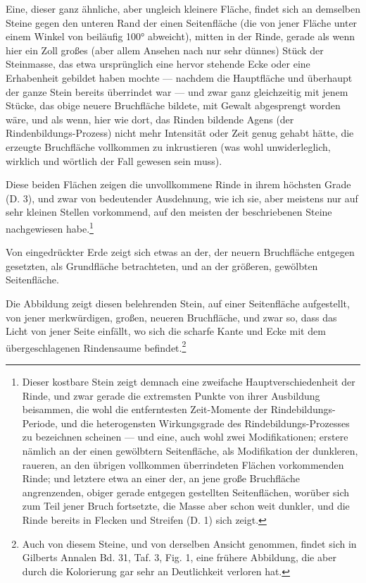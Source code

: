 \documentclass[a4paper, 11pt, oneside, german]{article}
\begin{document}
Eine, dieser ganz ähnliche, aber ungleich kleinere Fläche, findet sich an demselben Steine gegen den unteren Rand der einen Seitenfläche (die von jener Fläche unter einem Winkel von beiläufig 100° abweicht), mitten in der Rinde, gerade als wenn hier ein Zoll großes (aber allem Ansehen nach nur sehr dünnes) Stück der Steinmasse, das etwa ursprünglich eine hervor stehende Ecke oder eine Erhabenheit gebildet haben mochte --- nachdem die Hauptfläche und überhaupt der ganze Stein bereits überrindet war --- und zwar ganz gleichzeitig mit jenem Stücke, das obige neuere Bruchfläche bildete, mit Gewalt abgesprengt worden wäre, und als wenn, hier wie dort, das Rinden bildende Agens (der Rindenbildungs-Prozess) nicht mehr Intensität oder Zeit genug gehabt hätte, die erzeugte Bruchfläche vollkommen zu inkrustieren (was wohl unwiderleglich, wirklich und wörtlich der Fall gewesen sein muss).

Diese beiden Flächen zeigen die unvollkommene Rinde in ihrem höchsten Grade (D. 3), und zwar von bedeutender Ausdehnung, wie ich sie, aber meistens nur auf sehr kleinen Stellen vorkommend, auf den meisten der beschriebenen Steine nachgewiesen habe.\footnote{Dieser kostbare Stein zeigt demnach eine zweifache Hauptverschiedenheit der Rinde, und zwar gerade die extremsten Punkte von ihrer Ausbildung beisammen, die wohl die entferntesten Zeit-Momente der Rindebildungs-Periode, und die heterogensten Wirkungsgrade des Rindebildungs-Prozesses zu bezeichnen scheinen --- und eine, auch wohl zwei Modifikationen; erstere nämlich an der einen gewölbtern Seitenfläche, als Modifikation der dunkleren, raueren, an den übrigen vollkommen überrindeten Flächen vorkommenden Rinde; und letztere etwa an einer der, an jene große Bruchfläche angrenzenden, obiger gerade entgegen gestellten Seitenflächen, worüber sich zum Teil jener Bruch fortsetzte, die Masse aber schon weit dunkler, und die Rinde bereits in Flecken und Streifen (D. 1) sich zeigt.}

Von eingedrückter Erde zeigt sich etwas an der, der neuern Bruchfläche entgegen gesetzten, als Grundfläche betrachteten, und an der größeren, gewölbten Seitenfläche.

Die Abbildung zeigt diesen belehrenden Stein, auf einer Seitenfläche aufgestellt, von jener merkwürdigen, großen, neueren Bruchfläche, und zwar so, dass das Licht von jener Seite einfällt, wo sich die scharfe Kante und Ecke mit dem übergeschlagenen Rindensaume befindet.\footnote{Auch von diesem Steine, und von derselben Ansicht genommen, findet sich in Gilberts Annalen Bd. 31, Taf. 3, Fig. 1, eine frühere Abbildung, die aber durch die Kolorierung gar sehr an Deutlichkeit verloren hat.}
\end{document}
